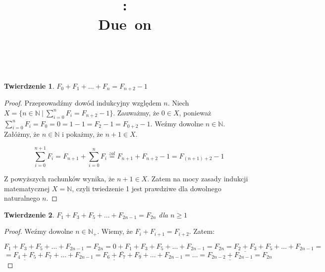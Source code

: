 \documentclass{article}
\title{
\vspace{2in}
\textmd{\textbf{\hmwkClass:\ \hmwkTitle}}\\
\normalsize\vspace{0.1in}\small{Due\ on\ \hmwkDueDate}\\
\vspace{0.1in}\large{\textit{\hmwkClassInstructor\ \hmwkClassTime}}
\vspace{3in}
}
\author{\textbf{\hmwkAuthorName}}
\date{} %
\newtheorem{thm}{Twierdzenie}
\begin{document}

\begin{center}
\end{center}

\begin{thm}
$F_0 + F_1 + \ldots + F_n = F_{n+2} - 1$
\end{thm}
\begin{proof}
Przeprowadźmy dowód indukcyjny względem $n$. Niech $X = \lbrace n \in \mathbb{N} \ | \ \sum_{i=0}^n F_i = F_{n+2} - 1 \rbrace$. Zauważmy, że $0 \in X$, ponieważ $\sum_{i=0}^n F_i = F_0 = 0 = 1 -1 = F_2 - 1 = F_{0+2} - 1$.
Weźmy dowolne $n \in \mathbb{N}$. Załóżmy, że $n \in \mathbb{N}$ i pokażmy, że $n+1 \in X$.

$$\sum_{i=0}^{n+1} F_i = F_{n+1} + \sum_{i=0}^n F_i \stackrel{zal}{=} F_{n+1} + F_{n+2} - 1 = F_{(n+1) + 2} - 1$$

Z powyższych rachunków wynika, że $n+1 \in X$. Zatem na mocy zasady indukcji matematycznej $X = \mathbb{N}$, czyli twiedzenie 1 jest prawdziwe dla dowolnego naturalnego $n$.
\end{proof}

\begin{thm}
$F_1 + F_3 + F_5 + \ldots + F_{2n-1} = F_{2n}$ dla $n \geq 1$
\end{thm}
\begin{proof}
Weźmy dowolne $n \in \mathbb{N}_+$. Wiemy, że $F_i + F_{i+1} = F_{i+2}$. Zatem:

$$
F_1 + F_3 + F_5 + \ldots + F_{2n-1} = F_{2n} = \underline{0 + F_1} + F_3 + F_5 + \ldots + F_{2n-1} = F_{2n} = \underline{F_2 + F_3} + F_5 + \ldots + F_{2n-1} = 
$$
$$
= \underline{F_4 + F_5} + F_7 + \ldots + F_{2n-1} = \underline{F_6 + F_7} + F_9 + \ldots + F_{2n-1} = \ldots = \underline{F_{2n-2} + F_{2n-1}} = F_{2n}
$$
\end{proof}
\end{document}
